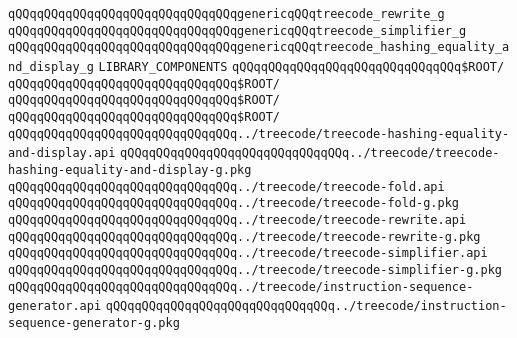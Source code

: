 \verb|qQQqqQQqqQQqqQQqqQQqqQQqqQQqqQQqgenericqQQqtreecode_rewrite_g|\newline
\verb|qQQqqQQqqQQqqQQqqQQqqQQqqQQqqQQqgenericqQQqtreecode_simplifier_g|\newline
\verb|qQQqqQQqqQQqqQQqqQQqqQQqqQQqqQQqgenericqQQqtreecode_hashing_equality_and_display_g|\newline
\newline
\newline
\newline
\verb|LIBRARY_COMPONENTS|\newline
\newline
\verb|qQQqqQQqqQQqqQQqqQQqqQQqqQQqqQQq$ROOT/|\newline
\newline
\verb|qQQqqQQqqQQqqQQqqQQqqQQqqQQqqQQq$ROOT/|\newline
\verb|qQQqqQQqqQQqqQQqqQQqqQQqqQQqqQQq$ROOT/|\newline
\verb|qQQqqQQqqQQqqQQqqQQqqQQqqQQqqQQq$ROOT/|\newline
\newline
\verb|qQQqqQQqqQQqqQQqqQQqqQQqqQQqqQQq../treecode/treecode-hashing-equality-and-display.api|\newline
\verb|qQQqqQQqqQQqqQQqqQQqqQQqqQQqqQQq../treecode/treecode-hashing-equality-and-display-g.pkg|\newline
\verb|qQQqqQQqqQQqqQQqqQQqqQQqqQQqqQQq../treecode/treecode-fold.api|\newline
\verb|qQQqqQQqqQQqqQQqqQQqqQQqqQQqqQQq../treecode/treecode-fold-g.pkg|\newline
\verb|qQQqqQQqqQQqqQQqqQQqqQQqqQQqqQQq../treecode/treecode-rewrite.api|\newline
\verb|qQQqqQQqqQQqqQQqqQQqqQQqqQQqqQQq../treecode/treecode-rewrite-g.pkg|\newline
\verb|qQQqqQQqqQQqqQQqqQQqqQQqqQQqqQQq../treecode/treecode-simplifier.api|\newline
\verb|qQQqqQQqqQQqqQQqqQQqqQQqqQQqqQQq../treecode/treecode-simplifier-g.pkg|\newline
\verb|qQQqqQQqqQQqqQQqqQQqqQQqqQQqqQQq../treecode/instruction-sequence-generator.api|\newline
\verb|qQQqqQQqqQQqqQQqqQQqqQQqqQQqqQQq../treecode/instruction-sequence-generator-g.pkg|\newline


